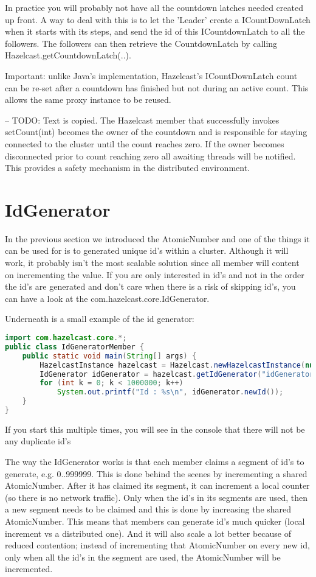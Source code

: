 \begin{enumerate}
In practice you will probably not have all the countdown latches needed created up front. A way to deal with this is to let the 'Leader' create a ICountDownLatch when it starts with its steps, and send the id of this ICountdownLatch to all the followers. The followers can then retrieve the CountdownLatch by calling Hazelcast.getCountdownLatch(..).

Important: unlike Java's implementation, Hazelcast's ICountDownLatch count can be re-set after a countdown has finished but not during an active count. This allows the same proxy instance to be reused.

-- TODO: Text is copied.
The Hazelcast member that successfully invokes setCount(int) becomes the owner of the countdown and is responsible for staying connected to the cluster until the count reaches zero. If the owner  becomes disconnected prior to count reaching zero all awaiting threads will be notified. This provides a safety mechanism in the distributed environment.

\section{IdGenerator}
In the previous section we introduced the AtomicNumber and one of the things it can be used for is to generated unique id's within a cluster. Although it will work, it probably isn't the most scalable solution since all member will content on incrementing the value. If you are only interested in id's and not in the order the id's are generated and don't care when there is a risk of skipping id's, you can have a look at the com.hazelcast.core.IdGenerator.

Underneath is a small example of the id generator:
\begin{lstlisting}[language=java]
import com.hazelcast.core.*;
public class IdGeneratorMember {
    public static void main(String[] args) {
        HazelcastInstance hazelcast = Hazelcast.newHazelcastInstance(null);
        IdGenerator idGenerator = hazelcast.getIdGenerator("idGenerator");
        for (int k = 0; k < 1000000; k++)
            System.out.printf("Id : %s\n", idGenerator.newId());
    }
}
\end{lstlisting}
If you start this multiple times, you will see in the console that there will not be any duplicate id's

The way the IdGenerator works is that each member claims a segment of id's to generate, e.g. 0..999999. This is done behind the scenes by incrementing a shared AtomicNumber. After it has claimed its segment, it can increment a local counter (so there is no network traffic). Only when the id's in its segments are used, then a new segment needs to be claimed and this is done by increasing the shared AtomicNumber. This means that members can generate id's much quicker (local increment vs a distributed one). And it will also scale a lot better because of reduced contention; instead of incrementing that AtomicNumber on every new id, only when all the id's in the segment are used, the AtomicNumber will be incremented.


\end{enumerate}
